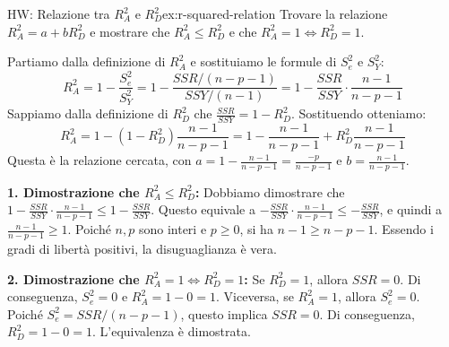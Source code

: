 \begin{esercizio}{HW: Relazione tra \(R_A^2\) e
\(R_D^2\)}{ex:r-squared-relation}
Trovare la relazione \(R_A^2 = a + b R_D^2\) e mostrare che \(R_A^2 \le R_D^2\)
e che \(R_A^2=1 \iff R_D^2=1\).
\begin{dimostrazione}{}{}
Partiamo dalla definizione di \(R_A^2\) e sostituiamo le formule di \(S_e^2\) e
\(S_Y^2\):
\[
    R_A^2 = 1 - \frac{S_e^2}{S_Y^2} = 1 - \frac{SSR/(n-p-1)}{SSY/(n-1)} = 1 -
    \frac{SSR}{SSY} \cdot \frac{n-1}{n-p-1}
\]
Sappiamo dalla definizione di \(R_D^2\) che \(\frac{SSR}{SSY} = 1 - R_D^2\).
Sostituendo otteniamo:
\[
    R_A^2 = 1 - (1 - R_D^2) \frac{n-1}{n-p-1} = 1 - \frac{n-1}{n-p-1} + R_D^2
    \frac{n-1}{n-p-1}
\]
Questa è la relazione cercata, con \(a = 1 - \frac{n-1}{n-p-1} =
\frac{-p}{n-p-1}\) e \(b = \frac{n-1}{n-p-1}\).

\textbf{1. Dimostrazione che \(R_A^2 \le R_D^2\):}
Dobbiamo dimostrare che \(1 - \frac{SSR}{SSY} \cdot \frac{n-1}{n-p-1} \le 1 -
\frac{SSR}{SSY}\).
Questo equivale a \(-\frac{SSR}{SSY} \cdot \frac{n-1}{n-p-1} \le
-\frac{SSR}{SSY}\), e quindi a \(\frac{n-1}{n-p-1} \ge 1\).
Poiché \(n, p\) sono interi e \(p \ge 0\), si ha \(n-1 \ge n-p-1\). Essendo i
gradi di libertà positivi, la disuguaglianza è vera.

\textbf{2. Dimostrazione che \(R_A^2=1 \iff R_D^2=1\):}
Se \(R_D^2=1\), allora \(SSR=0\). Di conseguenza, \(S_e^2=0\) e \(R_A^2 = 1 - 0
= 1\).
Viceversa, se \(R_A^2=1\), allora \(S_e^2=0\). Poiché \(S_e^2 = SSR/(n-p-1)\),
questo implica \(SSR=0\). Di conseguenza, \(R_D^2 = 1 - 0 = 1\). L'equivalenza
è dimostrata.
\end{dimostrazione}
\end{esercizio}

